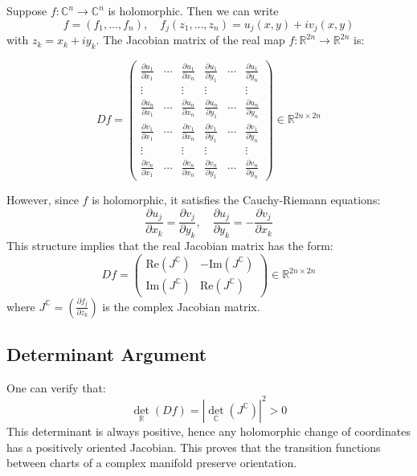 Suppose \( f: \mathbb{C}^n \to \mathbb{C}^n \) is holomorphic. Then we can write
\[
f = (f_1, \dots, f_n), \quad f_j(z_1, \dots, z_n) = u_j(x, y) + i v_j(x, y)
\]
with \( z_k = x_k + i y_k \). The Jacobian matrix of the real map \( f: \mathbb{R}^{2n} \to \mathbb{R}^{2n} \) is:

\[
Df =
\begin{pmatrix}
\frac{\partial u_1}{\partial x_1} & \cdots & \frac{\partial u_1}{\partial x_n} & \frac{\partial u_1}{\partial y_1} & \cdots & \frac{\partial u_1}{\partial y_n} \\
\vdots & & \vdots & \vdots & & \vdots \\
\frac{\partial u_n}{\partial x_1} & \cdots & \frac{\partial u_n}{\partial x_n} & \frac{\partial u_n}{\partial y_1} & \cdots & \frac{\partial u_n}{\partial y_n} \\
\frac{\partial v_1}{\partial x_1} & \cdots & \frac{\partial v_1}{\partial x_n} & \frac{\partial v_1}{\partial y_1} & \cdots & \frac{\partial v_1}{\partial y_n} \\
\vdots & & \vdots & \vdots & & \vdots \\
\frac{\partial v_n}{\partial x_1} & \cdots & \frac{\partial v_n}{\partial x_n} & \frac{\partial v_n}{\partial y_1} & \cdots & \frac{\partial v_n}{\partial y_n}
\end{pmatrix}
\in \mathbb{R}^{2n \times 2n}
\]

However, since \(f\) is holomorphic, it satisfies the Cauchy-Riemann equations:
\[
\frac{\partial u_j}{\partial x_k} = \frac{\partial v_j}{\partial y_k}, \quad
\frac{\partial u_j}{\partial y_k} = -\frac{\partial v_j}{\partial x_k}
\]
This structure implies that the real Jacobian matrix has the form:
\[
Df = 
\begin{pmatrix}
\mathrm{Re}(J^{\mathbb{C}}) & -\mathrm{Im}(J^{\mathbb{C}}) \\
\mathrm{Im}(J^{\mathbb{C}}) & \mathrm{Re}(J^{\mathbb{C}})
\end{pmatrix}
\in \mathbb{R}^{2n \times 2n}
\]
where \( J^{\mathbb{C}} = \left( \frac{\partial f_j}{\partial z_k} \right) \) is the complex Jacobian matrix.

\subsection*{Determinant Argument}

One can verify that:
\[
\det_{\mathbb{R}}(Df) = \left| \det_{\mathbb{C}}(J^{\mathbb{C}}) \right|^2 > 0
\]
This determinant is always positive, hence any holomorphic change of coordinates has a positively oriented Jacobian. This proves that the transition functions between charts of a complex manifold preserve orientation.


